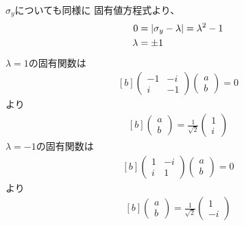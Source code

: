 \documentclass[../ap_2014.tex]{subfiles}
\begin{document}
\(\sigma_y\)についても同様に
固有値方程式より、
\begin{equation}\begin{aligned}[b]
    0 &= \abs{\sigma_y-\lambda}=\lambda^2-1\\
    \lambda &= \pm 1
\end{aligned}\end{equation}
\(\lambda=1\)の固有関数は
\begin{equation}\begin{aligned}[b]
    \begin{pmatrix}
        -1 & -i\\
        i & -1
    \end{pmatrix}\begin{pmatrix}
        a\\b
    \end{pmatrix} = 0
\end{aligned}\end{equation}
より
\begin{equation}\begin{aligned}[b]
    \begin{pmatrix}
        a\\b
    \end{pmatrix}
    = \frac{1}{\sqrt{2}}
    \begin{pmatrix}
        1 \\ i
    \end{pmatrix}
\end{aligned}\end{equation}
\(\lambda=-1\)の固有関数は
\begin{equation}\begin{aligned}[b]
    \begin{pmatrix}
        1 & -i\\
        i & 1
    \end{pmatrix}\begin{pmatrix}
        a\\b
    \end{pmatrix} = 0
\end{aligned}\end{equation}
より
\begin{equation}\begin{aligned}[b]
    \begin{pmatrix}
        a\\b
    \end{pmatrix}
    = \frac{1}{\sqrt{2}}
    \begin{pmatrix}
        1 \\ -i
    \end{pmatrix}
\end{aligned}\end{equation}
\end{document}
